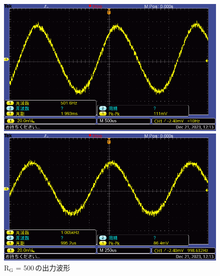 \documentclass{ltjsarticle}
\begin{document}
\begin{figure}[H]
\begin{minipage}{0.4\columnwidth}
			\end{minipage}
			\hspace{0.04\columnwidth}
			\begin{minipage}{0.4\columnwidth}
			\centering
			\includegraphics[width = \columnwidth]{figs/F0014TEK.PNG}
			\end{minipage}
			\hspace{0.04\columnwidth}
			\begin{minipage}{0.4\columnwidth}
			\centering
			\includegraphics[width = \columnwidth]{figs/F0015TEK.PNG}
			\end{minipage}
			\caption{$\mathrm{R_G}$ = 500\,\Omega の出力波形}
			\label{fig:week5-1-500}
			\end{figure}
\end{document}
